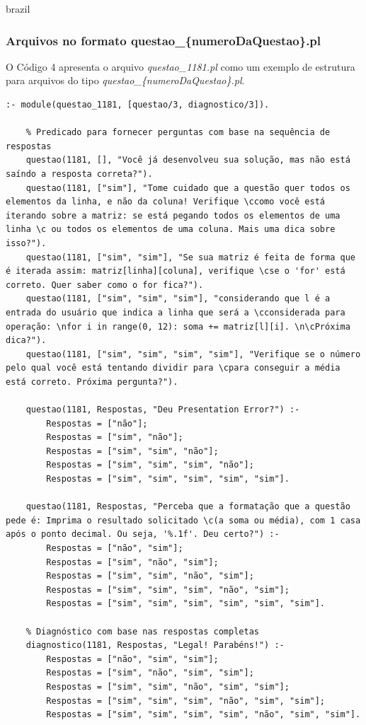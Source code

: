 \begin{otherlanguage*}{brazil}
\subsubsection{Arquivos no formato questao\_\{numeroDaQuestao\}.pl}

O Código 4 apresenta o arquivo \textit{questao\_1181.pl} como um exemplo de estrutura para arquivos do tipo \textit{questao\_\{numeroDaQuestao\}.pl}.

\begin{lstlisting}[style=ufscthesisx_style, caption={Arquivo \textit{questao\_1181.pl}}]
    :- module(questao_1181, [questao/3, diagnostico/3]).
    
    % Predicado para fornecer perguntas com base na sequência de respostas
    questao(1181, [], "Você já desenvolveu sua solução, mas não está saíndo a resposta correta?").
    questao(1181, ["sim"], "Tome cuidado que a questão quer todos os elementos da linha, e não da coluna! Verifique \ccomo você está iterando sobre a matriz: se está pegando todos os elementos de uma linha \c ou todos os elementos de uma coluna. Mais uma dica sobre isso?").
    questao(1181, ["sim", "sim"], "Se sua matriz é feita de forma que é iterada assim: matriz[linha][coluna], verifique \cse o 'for' está correto. Quer saber como o for fica?").
    questao(1181, ["sim", "sim", "sim"], "considerando que l é a entrada do usuário que indica a linha que será a \cconsiderada para operação: \nfor i in range(0, 12): soma += matriz[l][i]. \n\cPróxima dica?").
    questao(1181, ["sim", "sim", "sim", "sim"], "Verifique se o número pelo qual você está tentando dividir para \cpara conseguir a média está correto. Próxima pergunta?").
    
    questao(1181, Respostas, "Deu Presentation Error?") :-
        Respostas = ["não"];
        Respostas = ["sim", "não"];
        Respostas = ["sim", "sim", "não"];
        Respostas = ["sim", "sim", "sim", "não"];
        Respostas = ["sim", "sim", "sim", "sim", "sim"].
    
    questao(1181, Respostas, "Perceba que a formatação que a questão pede é: Imprima o resultado solicitado \c(a soma ou média), com 1 casa após o ponto decimal. Ou seja, '%.1f'. Deu certo?") :-
        Respostas = ["não", "sim"];
        Respostas = ["sim", "não", "sim"];
        Respostas = ["sim", "sim", "não", "sim"];
        Respostas = ["sim", "sim", "sim", "não", "sim"];
        Respostas = ["sim", "sim", "sim", "sim", "sim", "sim"].
    
    % Diagnóstico com base nas respostas completas
    diagnostico(1181, Respostas, "Legal! Parabéns!") :-
        Respostas = ["não", "sim", "sim"];
        Respostas = ["sim", "não", "sim", "sim"];
        Respostas = ["sim", "sim", "não", "sim", "sim"];
        Respostas = ["sim", "sim", "sim", "não", "sim", "sim"];
        Respostas = ["sim", "sim", "sim", "sim", "não", "sim", "sim"].
    

\end{lstlisting}
\end{otherlanguage*}
